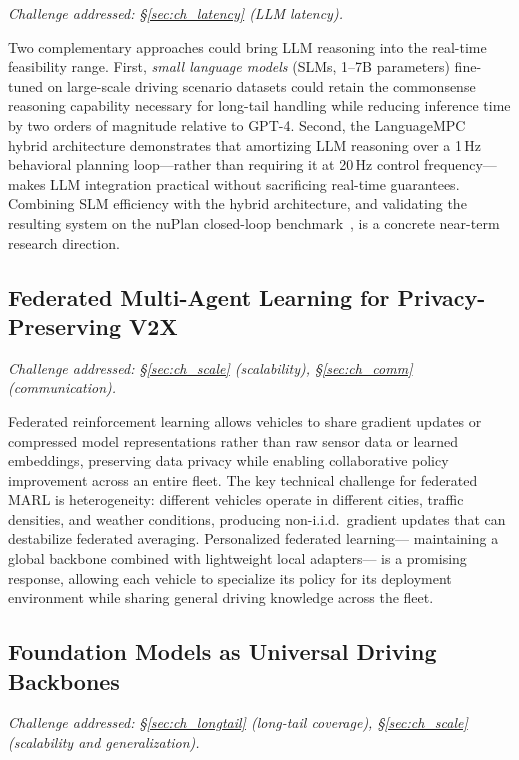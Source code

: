 \documentclass[12pt, a4paper]{article}
\begin{document}
\textit{Challenge addressed: \S\ref{sec:ch_latency} (LLM latency).}

Two complementary approaches could bring LLM reasoning into the real-time
feasibility range.  First, \emph{small language models} (SLMs, 1--7B parameters)
fine-tuned on large-scale driving scenario datasets could retain the
commonsense reasoning capability necessary for long-tail handling while
reducing inference time by two orders of magnitude relative to GPT-4.
Second, the LanguageMPC~\cite{sha2023languagempc} hybrid architecture
demonstrates that amortizing LLM reasoning over a 1\,Hz behavioral planning
loop---rather than requiring it at 20\,Hz control frequency---makes LLM
integration practical without sacrificing real-time guarantees.  Combining
SLM efficiency with the hybrid architecture, and validating the resulting
system on the nuPlan closed-loop benchmark~\cite{caesar2021nuplan}, is a
concrete near-term research direction.

\subsection{Federated Multi-Agent Learning for Privacy-Preserving V2X}

\textit{Challenge addressed: \S\ref{sec:ch_scale} (scalability),
\S\ref{sec:ch_comm} (communication).}

Federated reinforcement learning allows vehicles to share gradient updates
or compressed model representations rather than raw sensor data or learned
embeddings, preserving data privacy while enabling collaborative policy
improvement across an entire fleet.  The key technical challenge for federated
MARL is heterogeneity: different vehicles operate in different cities, traffic
densities, and weather conditions, producing non-i.i.d.\ gradient updates
that can destabilize federated averaging.  Personalized federated learning---
maintaining a global backbone combined with lightweight local adapters---
is a promising response, allowing each vehicle to specialize its policy
for its deployment environment while sharing general driving knowledge
across the fleet.

\subsection{Foundation Models as Universal Driving Backbones}

\textit{Challenge addressed: \S\ref{sec:ch_longtail} (long-tail coverage),
\S\ref{sec:ch_scale} (scalability and generalization).}
\end{document}
